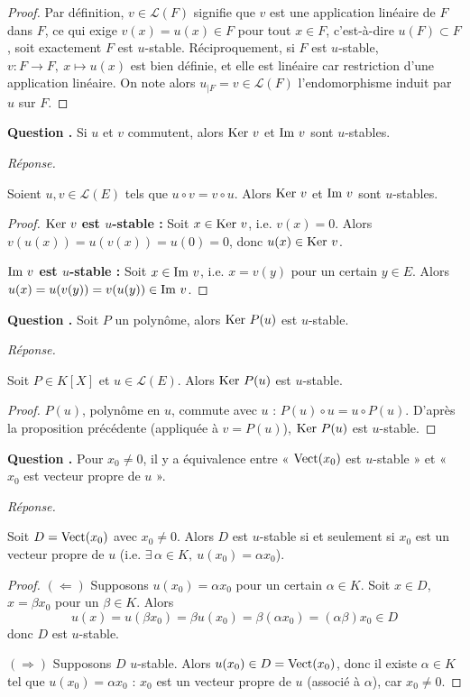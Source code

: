 \documentclass[11pt]{article}
\newcounter{qnum}
\newcommand{\question}[1]{%
\stepcounter{qnum}%
\bigskip
\noindent\textbf{Question \theqnum.} #1\par}
\newcommand{\reponse}{\noindent\textit{Réponse.}\ }
\begin{document}
\begin{proof}
Par définition, $v\in\mathcal{L}(F)$ signifie que $v$ est une application linéaire de $F$ dans $F$, ce qui exige $v(x)=u(x)\in F$ pour tout $x\in F$, c'est-à-dire $u(F)\subset F$, soit exactement $F$ est $u$-stable. Réciproquement, si $F$ est $u$-stable, $v:F\to F,\ x\mapsto u(x)$ est bien définie, et elle est linéaire car restriction d'une application linéaire. On note alors $u_{|F}=v\in\mathcal{L}(F)$ l'endomorphisme induit par $u$ sur $F$.
\end{proof}

\question{Si $u$ et $v$ commutent, alors $\operatorname{Ker}\,v$ et $\operatorname{Im}\,v$ sont $u$-stables.}
\reponse
\begin{prop}
Soient $u,v\in\mathcal{L}(E)$ tels que $u\circ v=v\circ u$. Alors $\operatorname{Ker}\,v$ et $\operatorname{Im}\,v$ sont $u$-stables.
\end{prop}

\begin{proof}
\textbf{$\operatorname{Ker}\,v$ est $u$-stable :} Soit $x\in\operatorname{Ker}\,v$, i.e. $v(x)=0$. Alors $v(u(x))=u(v(x))=u(0)=0$, donc $u(x)\in\operatorname{Ker}\,v$.

\textbf{$\operatorname{Im}\,v$ est $u$-stable :} Soit $x\in\operatorname{Im}\,v$, i.e. $x=v(y)$ pour un certain $y\in E$. Alors $u(x)=u(v(y))=v(u(y))\in\operatorname{Im}\,v$.
\end{proof}

\question{Soit $P$ un polynôme, alors $\operatorname{Ker}\,P(u)$ est $u$-stable.}
\reponse
\begin{prop}
Soit $P\in K[X]$ et $u\in\mathcal{L}(E)$. Alors $\operatorname{Ker}\,P(u)$ est $u$-stable.
\end{prop}

\begin{proof}
$P(u)$, polynôme en $u$, commute avec $u$ : $P(u)\circ u=u\circ P(u)$. D'après la proposition précédente (appliquée à $v=P(u)$), $\operatorname{Ker}\,P(u)$ est $u$-stable.
\end{proof}

\question{Pour $x_0\neq 0$, il y a équivalence entre « $\operatorname{Vect}(x_0)$ est $u$-stable » et « $x_0$ est vecteur propre de $u$ ».}
\reponse
\begin{prop}
Soit $D=\operatorname{Vect}(x_0)$ avec $x_0\neq 0$. Alors $D$ est $u$-stable si et seulement si $x_0$ est un vecteur propre de $u$ (i.e. $\exists\,\alpha\in K,\ u(x_0)=\alpha x_0$).
\end{prop}

\begin{proof}
$(\Leftarrow)$ Supposons $u(x_0)=\alpha x_0$ pour un certain $\alpha\in K$. Soit $x\in D$, $x=\beta x_0$ pour un $\beta\in K$. Alors
\[u(x) = u(\beta x_0) = \beta u(x_0) = \beta(\alpha x_0) = (\alpha\beta)x_0 \in D\]
donc $D$ est $u$-stable.

$(\Rightarrow)$ Supposons $D$ $u$-stable. Alors $u(x_0)\in D=\operatorname{Vect}(x_0)$, donc il existe $\alpha\in K$ tel que $u(x_0)=\alpha x_0$ : $x_0$ est un vecteur propre de $u$ (associé à $\alpha$), car $x_0\neq 0$.
\end{proof}
\end{document}
